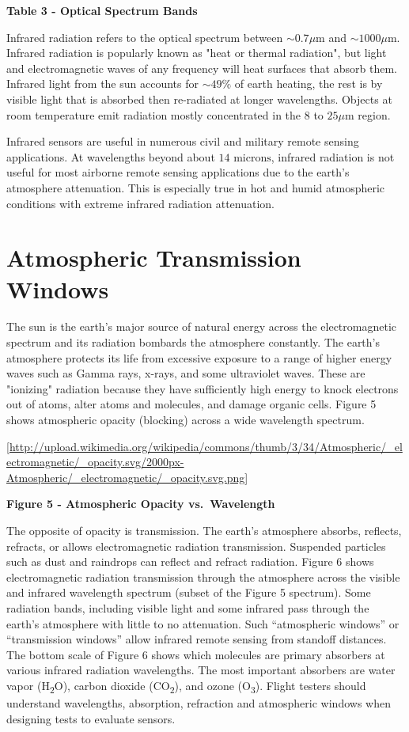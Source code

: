 \documentclass[
]{book}
\begin{document}
\textbf{Table 3 - Optical Spectrum Bands}

Infrared radiation refers to the optical spectrum between
\(\sim 0.7 \mu\text{m}\) and \(\sim 1000 \mu\text{m}\). Infrared radiation is
popularly known as "heat or thermal radiation", but light and electromagnetic
waves of any frequency will heat surfaces that absorb them. Infrared light from
the sun accounts for \(\sim 49\%\) of earth heating, the rest is by visible light
that is absorbed then re-radiated at longer wavelengths. Objects at room
temperature emit radiation mostly concentrated in the \(8\) to
\(25 \mu\text{m}\) region.

Infrared sensors are useful in numerous civil and military remote sensing
applications. At wavelengths beyond about \(14 \text{ microns}\), infrared
radiation is not useful for most airborne remote sensing applications due to the
earth's atmosphere attenuation. This is especially true in hot and humid
atmospheric conditions with extreme infrared radiation attenuation.

\hypertarget{atmospheric-transmission-windows}{%
\section{Atmospheric Transmission Windows}\label{atmospheric-transmission-windows}}

The sun is the earth's major source of natural energy across the electromagnetic
spectrum and its radiation bombards the atmosphere constantly. The earth's
atmosphere protects its life from excessive exposure to a range of higher energy
waves such as Gamma rays, x-rays, and some ultraviolet waves. These are
"ionizing" radiation because they have sufficiently high energy to knock
electrons out of atoms, alter atoms and molecules, and damage organic cells.
Figure 5 shows atmospheric opacity (blocking) across a wide wavelength spectrum.

{[}\url{http://upload.wikimedia.org/wikipedia/commons/thumb/3/34/Atmospheric/_electromagnetic/_opacity.svg/2000px-Atmospheric/_electromagnetic/_opacity.svg.png}{]}

\textbf{Figure 5 - Atmospheric Opacity vs.~Wavelength}

The opposite of opacity is transmission. The earth's atmosphere absorbs,
reflects, refracts, or allows electromagnetic radiation transmission. Suspended
particles such as dust and raindrops can reflect and refract radiation. Figure 6
shows electromagnetic radiation transmission through the atmosphere across the
visible and infrared wavelength spectrum (subset of the Figure 5 spectrum). Some
radiation bands, including visible light and some infrared pass through the
earth's atmosphere with little to no attenuation. Such ``atmospheric windows'' or
``transmission windows'' allow infrared remote sensing from standoff distances.
The bottom scale of Figure 6 shows which molecules are primary absorbers at
various infrared radiation wavelengths. The most important absorbers are water
vapor (H\textsubscript{2}O), carbon dioxide (CO\textsubscript{2}), and ozone (O\textsubscript{3}). Flight testers should
understand wavelengths, absorption, refraction and atmospheric windows when
designing tests to evaluate sensors.
\end{document}
